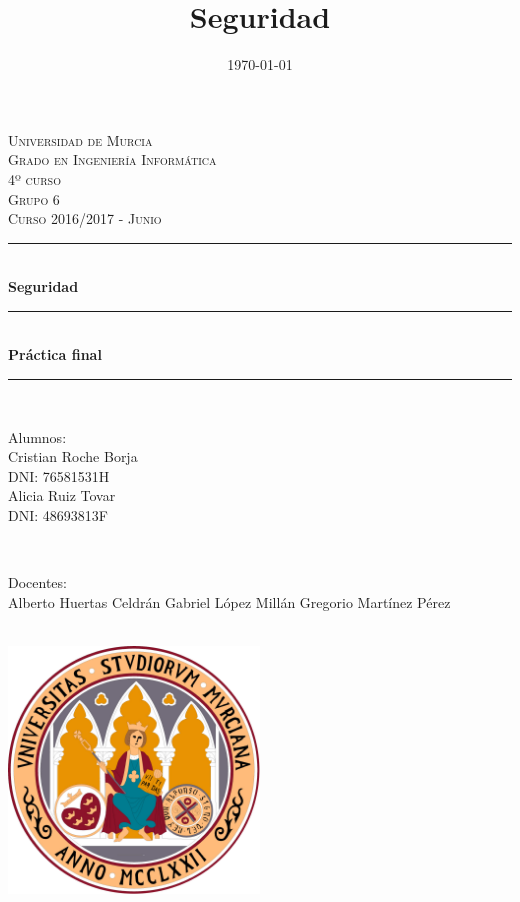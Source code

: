 \documentclass[a4,12pt,onecolum]{article}
\title{Seguridad}
\date{\today}
\begin{document}

\begin{titlepage}

\newcommand{\HRule}{\rule{\linewidth}{0.5mm}} %

\center %

\textsc{\LARGE Universidad de Murcia}\\[0.8cm]
\textsc{\Large Grado en Ingeniería Informática}\\[0.5cm]
\textsc{\large 4º curso}\\[0.4cm]
\textsc{\large Grupo 6}\\[0.4cm]
\textsc{\large Curso 2016/2017 - Junio}\\[0.4cm]

\HRule \\[0.6cm]
{ \huge \bfseries Seguridad}\\[0.3cm]
\HRule \\[0.5cm]
{ \Large \bfseries Práctica final}\\[0.3cm]
\HRule \\[1.0cm]


\begin{minipage}{0.4\textwidth}
\begin{flushleft} \large
Alumnos:\\
Cristian Roche Borja \\
\small{DNI: 76581531H}	\\
\large{Alicia Ruiz Tovar} \\
\small{DNI: 48693813F}
\end{flushleft}
\end{minipage}
~
\begin{minipage}{0.4\textwidth}
\begin{flushright} \large
Docentes: \\
Alberto Huertas Celdrán
Gabriel López Millán
Gregorio Martínez Pérez
\end{flushright}
\end{minipage}\\[1cm]


\centering
\includegraphics[width=0.5\textwidth]{./portada/logoum.png}\\[0.8cm] %

\end{titlepage}
\end{document}

